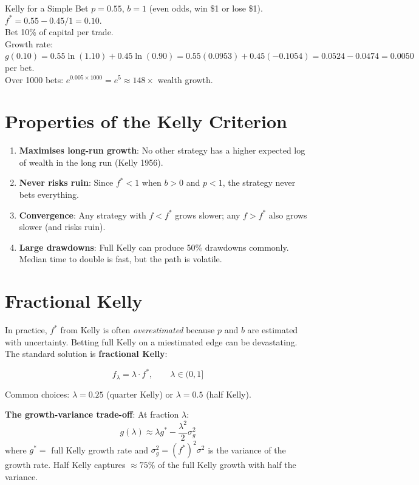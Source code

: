 \documentclass[12pt,a4paper,openany]{report}
\theoremstyle{definition}
\begin{document}
\begin{examplebox}{Kelly for a Simple Bet}
$p = 0.55$, $b = 1$ (even odds, win \$1 or lose \$1). \\
$f^* = 0.55 - 0.45/1 = 0.10$. \\
Bet 10\% of capital per trade. \\
Growth rate: $g(0.10) = 0.55\ln(1.10) + 0.45\ln(0.90) = 0.55(0.0953) + 0.45(-0.1054) = 0.0524 - 0.0474 = 0.0050$ per bet. \\
Over 1000 bets: $e^{0.005 \times 1000} = e^5 \approx 148\times$ wealth growth.
\end{examplebox}

\section{Properties of the Kelly Criterion}

\begin{enumerate}[label=\arabic*.]
  \item \textbf{Maximises long-run growth}: No other strategy has a higher expected log of wealth in the long run (Kelly 1956).
  \item \textbf{Never risks ruin}: Since $f^* < 1$ when $b > 0$ and $p < 1$, the strategy never bets everything.
  \item \textbf{Convergence}: Any strategy with $f < f^*$ grows slower; any $f > f^*$ also grows slower (and risks ruin).
  \item \textbf{Large drawdowns}: Full Kelly can produce 50\% drawdowns commonly. Median time to double is fast, but the path is volatile.
\end{enumerate}

\section{Fractional Kelly}

In practice, $f^*$ from Kelly is often \emph{overestimated} because $p$ and $b$ are estimated with uncertainty. Betting full Kelly on a miestimated edge can be devastating. The standard solution is \textbf{fractional Kelly}:

\begin{equation}
  f_{\lambda} = \lambda \cdot f^*, \qquad \lambda \in (0, 1]
\end{equation}

Common choices: $\lambda = 0.25$ (quarter Kelly) or $\lambda = 0.5$ (half Kelly).

\textbf{The growth-variance trade-off}: At fraction $\lambda$:
\begin{equation}
  g(\lambda) \approx \lambda g^* - \frac{\lambda^2}{2}\sigma_g^2
\end{equation}
where $g^* = $ full Kelly growth rate and $\sigma_g^2 = (f^*)^2 \sigma^2$ is the variance of the growth rate. Half Kelly captures $\approx 75\%$ of the full Kelly growth with half the variance.
\end{document}
